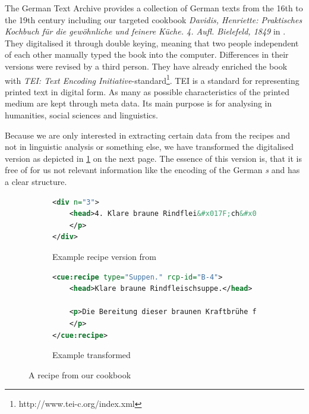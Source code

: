\documentclass[12pt, twoside]{report}
\newcommand*\longs{{\fontencoding{TS1}\selectfont s}}
\begin{document}
The German Text Archive provides a collection of German texts from the 16th to the 19th century including our targeted cookbook \textit{Davidis, Henriette: Praktisches Kochbuch für die gewöhnliche und feinere Küche. 4. Aufl. Bielefeld, 1849} in \parencite{DTA}. They digitalised it through double keying, meaning that two people independent of each other manually typed the book into the computer. Differences in their versions were revised by a third person. They have already enriched the book with \textit{TEI: Text Encoding Initiative}-standard\footnote{http://www.tei-c.org/index.xml}. TEI is a standard for representing printed text in digital form. As many as possible characteristics of the printed medium are kept through meta data. Its main purpose is for analysing in humanities, social sciences and linguistics.

Because we are only interested in extracting certain data from the recipes and not in linguistic analysis or something else, we have transformed the digitalised version as depicted in \cref{fig:davidisRecipe} on the next page. The essence of this version is, that it is free of for us not relevant information like the encoding of the German \textit{\longs} and has a clear structure. 

\begin{figure}
	\begin{subfigure}{1\textwidth}
	\begin{lstlisting}[language=XML]
<div n="3">
	<head>4. Klare braune Rindflei&#x017F;ch&#x017F;uppe.</head> <lb/> <p>Die Bereitung die&#x017F;er braunen Kraftbrühe findet man in<lb/> <hi rendition="#aq">A.</hi> No. 12. Zu einer Ge&#x017F;ell&#x017F;chaft	von 12 Per&#x017F;onen nimmt<lb/> man 6 Pfund Rindflei&#x017F;ch und 1 Pfund rohen Schinken. Es<lb/> werden braune Klöße No. 3 und Schwammklöße darin gemacht.<lb/> Auch kann man nach Belieben braunen Sago darin kochen.
	</p>
</div>
	\end{lstlisting}\caption{Example recipe version from \parencite{DTA}}\vspace{1em}
	\end{subfigure}
	\begin{subfigure}{1\textwidth}
\begin{lstlisting}[language=XML]
<cue:recipe type="Suppen." rcp-id="B-4">
	<head>Klare braune Rindfleischsuppe.</head>
	
	<p>Die Bereitung dieser braunen Kraftbrühe findet man in A. No. 12. Zu einer Gesellschaft von 12 Personen nimmt man 6 Pfund Rindfleisch und 1 Pfund rohen Schinken. Es werden braune Klöße No. 3 und Schwammklöße darin gemacht. Auch kann man nach Belieben braunen Sago darin kochen.
	</p>
</cue:recipe>
\end{lstlisting}\caption{Example transformed}
	\end{subfigure}
	\caption{A recipe from our cookbook}
	\label{fig:davidisRecipe}
\end{figure}
\end{document}
